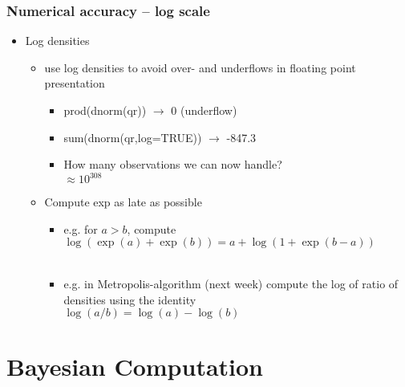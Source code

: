 \documentclass[10pt]{beamer}
\begin{document}
\begin{frame}

\frametitle{Numerical accuracy -- log scale}

  \begin{itemize}
  \item Log densities
    \begin{itemize}
    \item use log densities to avoid over- and underflows in floating
      point presentation
      \begin{itemize}
      \item {\color{uured} prod(dnorm(qr)) $\rightarrow$} {\color{red} 0 (underflow)}
      \item {\color{uured} sum(dnorm(qr,log=TRUE)) $\rightarrow$} {\color{uured} -847.3}
      \item<2-> How many observations we can now handle? \\
      $\approx 10^{308}$
    \end{itemize}
    \item<3-> Compute exp as late as possible
      \begin{itemize}
      \item<4-> e.g. for $a>b$, compute $\log(\exp(a)+\exp(b)) = a + \log(1+\exp(b-a))$\\
        \\
      \item<7-> e.g. in Metropolis-algorithm (next week) compute the log of ratio of densities using the identity\\
        $\log(a/b)=\log(a)-\log(b)$
    \end{itemize}
    \end{itemize}
  \end{itemize}

\end{frame}

\section{Bayesian Computation}
\frame{\sectionpage}
\end{document}
